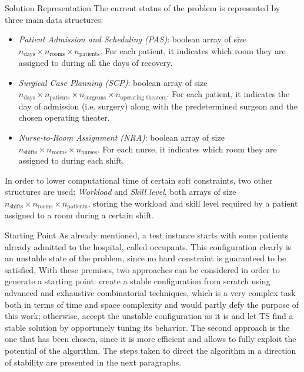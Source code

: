 \begin{section}
 \begin{subsection}
     {Solution Representation}
     The current status of the problem is represented by
     three main data structures:
     \begin{itemize}
         \item \textit{Patient Admission and Scheduling (PAS)}:
               boolean array of size $n_{\text{days}} \times n_{\text{rooms}} \times n_{\text{patients}}$.
               For each patient, it indicates which room they are assigned to during all the days of recovery.
         \item \textit{Surgical Case Planning (SCP)}:
               boolean array of size $n_{\text{days}} \times n_{\text{patients}} \times n_{\text{surgeons}} \times n_{\text{operating theaters}}$.
               For each patient, it indicates the day of admission (i.e. surgery) along with the predetermined surgeon and the chosen operating theater.
         \item \textit{Nurse-to-Room Assignment (NRA)}:
               boolean array of size $n_{\text{shifts}} \times n_{\text{rooms}} \times n_{\text{nurses}}$.
               For each nurse, it indicates which room they are assigned to during each shift.
     \end{itemize}
     In order to lower computational time of certain soft constraints, two other structures are used:
     \textit{Workload} and \textit{Skill level}, both arrays of size $n_{\text{shifts}} \times n_{\text{rooms}} \times n_{\text{patients}}$,
     storing the workload and skill level required by a patient assigned to a room during a certain shift.
 \end{subsection}

 \begin{subsection}
     {Starting Point}
     As already mentioned, a test instance starts with some patients already admitted to the hospital, called occupants.
     This configuration clearly is an unstable state of the problem, since no hard constraint is guaranteed to be satisfied.
     With these premises, two approaches can be considered in order to generate a starting point: create a stable configuration from scratch
     using advanced and exhaustive combinatorial techniques, which is a very complex task both
     in terms of time and space complexity and would partly defy the purpose of this work;
     otherwise, accept the unstable configuration as it is and let TS
     find a stable solution by opportunely tuning its behavior.
     The second approach is the one that has been chosen, since it is more efficient and allows to fully exploit
     the potential of the algorithm.
     The steps taken to direct the algorithm in a direction of stability are presented
     in the next paragraphs.


\end{subsection}
\end{section}
